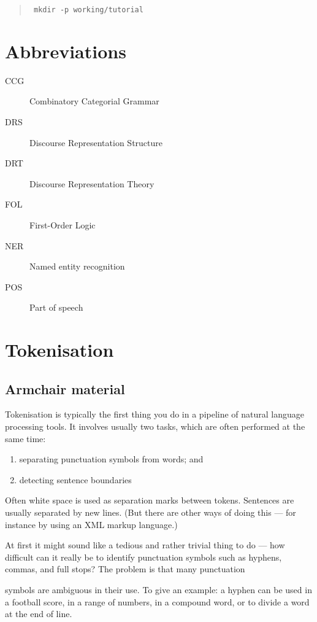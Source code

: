 \documentclass[11pt]{article}
\newcommand{\mnote}[1]
{
  \marginpar{\small #1}
  #1
}
\begin{document}
\begin{quote}\tt
mkdir -p working/tutorial
\end{quote}

\vfill
\section*{Abbreviations}

\begin{description}
\item [CCG] Combinatory Categorial Grammar
\item [DRS] Discourse Representation Structure
\item [DRT] Discourse Representation Theory
\item [FOL] First-Order Logic
\item [NER] Named entity recognition
\item [POS] Part of speech
\end{description}



%
%
\clearpage
\section{Tokenisation}\label{section:tokeniser}

\subsection*{Armchair material}

Tokenisation is typically the first thing you do in a pipeline of
natural language processing tools.  It involves usually two tasks,
which are often performed at the same time:

\begin{enumerate}
\item separating punctuation symbols from words; and
\item detecting sentence boundaries 
\end{enumerate}

Often white space is used as separation marks between tokens.
Sentences are usually separated by new lines. (But there are other
ways of doing this --- for instance by using an XML markup language.)

At first it might sound like a  tedious and rather trivial thing to do --- how
difficult can it really be to identify punctuation symbols such as
hyphens, commas, and full stops? The problem is that many \mnote{punctuation}
symbols are ambiguous in their use. To give an example: a hyphen can be used
in a football score, in a range of numbers, in a compound word, or to
divide a word at the end of line. 
\end{document}
